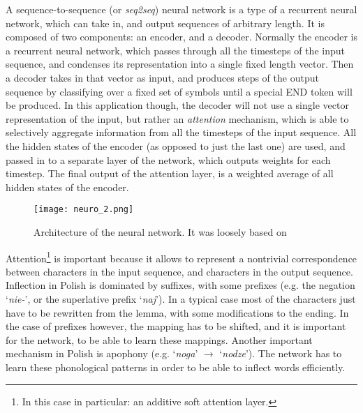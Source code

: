 \documentclass[12pt]{article}
\newcommand{\inlinegloss}[1]{`\textit{#1}'}
\begin{document}
A sequence-to-sequence (or \textit{seq2seq}) neural network is a type of a recurrent neural network, which can take in, and output sequences of arbitrary length. It is composed of two components: an encoder, and a decoder. Normally the encoder is a recurrent neural network, which passes through all the timesteps of the input sequence, and condenses its representation into a single fixed length vector. Then a decoder takes in that vector as input, and produces steps of the output sequence by classifying over a fixed set of symbols until a special \textsc{END} token will be produced. In this application though, the decoder will not use a single vector representation of the input, but rather an \textit{attention} mechanism, which is able to selectively aggregate information from all the timesteps of the input sequence. All the hidden states of the encoder (as opposed to just the last one) are used, and passed in to a separate layer of the network, which outputs weights for each timestep. The final output of the attention layer, is a weighted average of all hidden states of the encoder.

\begin{figure}[H]
\centering
\texttt{[image: neuro\_2.png]}
\caption{Architecture of the neural network. It was loosely based on \cite{faruqui:2016:infl}} \label{fig:neuro}
\end{figure}

Attention\footnote{In this case in particular: an additive soft attention layer.} is important because it allows to represent a nontrivial correspondence between characters in the input sequence, and characters in the output sequence. Inflection in Polish is dominated by suffixes, with some prefixes (e.g. the negation \inlinegloss{nie-}, or the superlative prefix \inlinegloss{naj}). In a typical case most of the characters just have to be rewritten from the lemma, with some modifications to the ending. In the case of prefixes however, the mapping has to be shifted, and it is important for the network, to be able to learn these mappings. Another important mechanism in Polish is apophony (e.g. \inlinegloss{noga} $\rightarrow$ \inlinegloss{nodze}). The network has to learn these phonological patterns in order to be able to inflect words efficiently.
\end{document}
